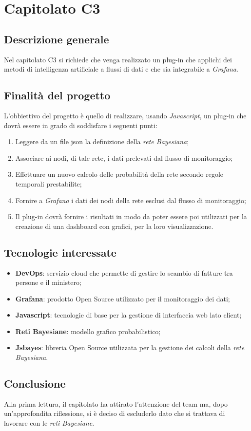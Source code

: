 \chapter{Capitolato C3}
\section{Descrizione generale}
Nel capitolato C3 si richiede che venga realizzato un plug-in che applichi dei metodi di intelligenza artificiale a flussi di dati e che sia integrabile a \emph{Grafana}.
\section{Finalit\`a del progetto}
L'obbiettivo del progetto è quello di realizzare, usando \emph{Javascript}, un plug-in che dovrà essere in grado di soddisfare i seguenti punti:
\begin{enumerate}
	\item Leggere da un file json la definizione della \emph{rete Bayesiana};
	\item Associare ai nodi, di tale rete, i dati prelevati dal flusso di monitoraggio;
	\item Effettuare un nuovo calcolo delle probabilit\`a della rete secondo regole temporali prestabilite;
	\item Fornire a \emph{Grafana} i dati dei nodi della rete esclusi dal flusso di monitoraggio;
	\item Il plug-in dovrà fornire i risultati in modo da poter essere poi utilizzati per la creazione di una dashboard con grafici, per la loro visualizzazione. 
\end{enumerate}
\section{Tecnologie interessate}
\begin{itemize}
	\item \textbf{DevOps}: servizio cloud che permette di gestire lo scambio di fatture tra persone e il ministero;
	\item \textbf{Grafana}: prodotto Open Source utilizzato per il monitoraggio dei dati;
	\item \textbf{Javascript}: tecnologie di base per la gestione di interfaccia web lato client;
	\item \textbf{Reti Bayesiane}: modello grafico probabilistico;
	\item \textbf{Jsbayes}: libreria Open Source utilizzata per la gestione dei calcoli della \emph{rete Bayesiana}.
\end{itemize}
\section{Conclusione}
Alla prima lettura, il capitolato ha attirato l'attenzione del team ma, dopo un'approfondita riflessione, si è deciso di escluderlo dato che si trattava di lavorare con le \emph{reti Bayesiane}.